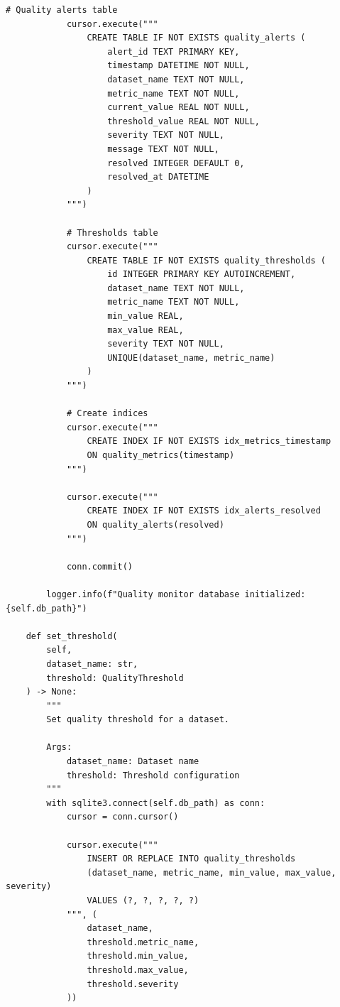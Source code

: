 \begin{lstlisting}[style=python, caption={Real-time quality monitoring with SQLite backend}]
            # Quality alerts table
            cursor.execute("""
                CREATE TABLE IF NOT EXISTS quality_alerts (
                    alert_id TEXT PRIMARY KEY,
                    timestamp DATETIME NOT NULL,
                    dataset_name TEXT NOT NULL,
                    metric_name TEXT NOT NULL,
                    current_value REAL NOT NULL,
                    threshold_value REAL NOT NULL,
                    severity TEXT NOT NULL,
                    message TEXT NOT NULL,
                    resolved INTEGER DEFAULT 0,
                    resolved_at DATETIME
                )
            """)

            # Thresholds table
            cursor.execute("""
                CREATE TABLE IF NOT EXISTS quality_thresholds (
                    id INTEGER PRIMARY KEY AUTOINCREMENT,
                    dataset_name TEXT NOT NULL,
                    metric_name TEXT NOT NULL,
                    min_value REAL,
                    max_value REAL,
                    severity TEXT NOT NULL,
                    UNIQUE(dataset_name, metric_name)
                )
            """)

            # Create indices
            cursor.execute("""
                CREATE INDEX IF NOT EXISTS idx_metrics_timestamp
                ON quality_metrics(timestamp)
            """)

            cursor.execute("""
                CREATE INDEX IF NOT EXISTS idx_alerts_resolved
                ON quality_alerts(resolved)
            """)

            conn.commit()

        logger.info(f"Quality monitor database initialized: {self.db_path}")

    def set_threshold(
        self,
        dataset_name: str,
        threshold: QualityThreshold
    ) -> None:
        """
        Set quality threshold for a dataset.

        Args:
            dataset_name: Dataset name
            threshold: Threshold configuration
        """
        with sqlite3.connect(self.db_path) as conn:
            cursor = conn.cursor()

            cursor.execute("""
                INSERT OR REPLACE INTO quality_thresholds
                (dataset_name, metric_name, min_value, max_value, severity)
                VALUES (?, ?, ?, ?, ?)
            """, (
                dataset_name,
                threshold.metric_name,
                threshold.min_value,
                threshold.max_value,
                threshold.severity
            ))


\end{lstlisting}

